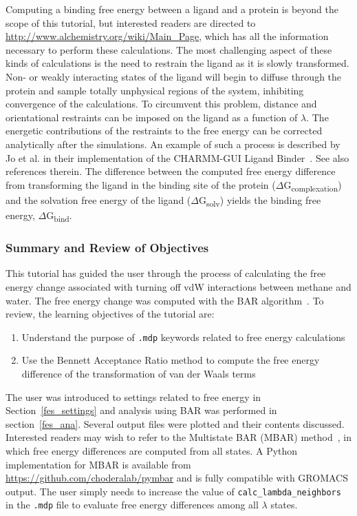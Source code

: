 \documentclass[9pt,tutorial,pubversion]{livecoms}
\begin{document}
Computing a binding free energy between a ligand and a protein is beyond the scope of this tutorial, but interested readers are directed to \url{http://www.alchemistry.org/wiki/Main_Page}, which has all the information necessary to perform these calculations. The most challenging aspect of these kinds of calculations is the need to restrain the ligand as it is slowly transformed. Non- or weakly interacting states of the ligand will begin to diffuse through the protein and sample totally unphysical regions of the system, inhibiting convergence of the calculations. To circumvent this problem, distance and orientational restraints can be imposed on the ligand as a function of $\lambda$. The energetic contributions of the restraints to the free energy can be corrected analytically after the simulations. An example of such a process is described by Jo et al. in their implementation of the CHARMM-GUI Ligand Binder~\cite{Jo2012}. See also references therein. The difference between the computed free energy difference from transforming the ligand in the binding site of the protein ($\Delta$G\textsubscript{complexation}) and the solvation free energy of the ligand ($\Delta$G\textsubscript{solv}) yields the binding free energy, $\Delta$G\textsubscript{bind}.

\subsubsection{Summary and Review of Objectives} \label{fes_summary}

This tutorial has guided the user through the process of calculating the free energy change associated with turning off vdW interactions between methane and water. The free energy change was computed with the BAR algorithm~\cite{Bennett1976}. To review, the learning objectives of the tutorial are:

\begin{enumerate}
	\item Understand the purpose of \texttt{.mdp} keywords related to free energy calculations
	\item Use the Bennett Acceptance Ratio method to compute the free energy difference of the transformation of van der Waals terms
\end{enumerate}

The user was introduced to settings related to free energy in Section~\ref{fes_settings} and analysis using BAR was performed in section~\ref{fes_ana}. Several output files were plotted and their contents discussed. Interested readers may wish to refer to the Multistate BAR (MBAR) method~\cite{Shirts2008}, in which free energy differences are computed from all states. A Python implementation for MBAR is available from \url{https://github.com/choderalab/pymbar} and is fully compatible with GROMACS output. The user simply needs to increase the value of \texttt{calc\_lambda\_neighbors} in the \texttt{.mdp} file to evaluate free energy differences among all $\lambda$ states.
\end{document}
